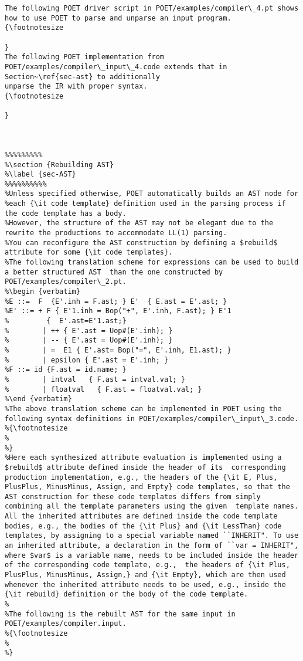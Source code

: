 \documentclass[11pt]{article}
\begin{document}
\begin {verbatim}
The following POET driver script in POET/examples/compiler\_4.pt shows how to use POET to parse and unparse an input program.
{\footnotesize

}
The following POET implementation from POET/examples/compiler\_input\_4.code extends that in Section~\ref{sec-ast} to additionally
unparse the IR with proper syntax.
{\footnotesize

}



%
% 
%



\end{verbatim}
\end{document}
